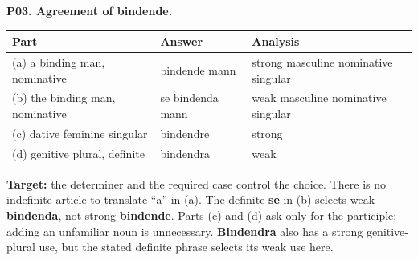\par\begin{minipage}{\linewidth}\raggedright
\textbf{P03. Agreement of bindende.}

\par\begingroup
\fontsize{10.5}{13.2}\selectfont
\setlength{\LTleft}{0pt}\setlength{\LTright}{\fill}
\noindent
\begin{tabular}{@{}>{\raggedright\arraybackslash}p{43.2mm}>{\raggedright\arraybackslash}p{26.98mm}>{\raggedright\arraybackslash}p{48.19mm}@{}}
\toprule
\textbf{Part} & \textbf{Answer} & \textbf{Analysis} \\
\midrule
(a) a binding man, nominative & bindende mann & strong masculine nominative singular \\
(b) the binding man, nominative & se bindenda mann & weak masculine nominative singular \\
(c) dative feminine singular & bindendre & strong \\
(d) genitive plural, definite & bindendra & weak \\
\bottomrule
\end{tabular}
\par\endgroup

\textbf{Target:} the determiner and the required case control the choice. There is no indefinite article to translate “a” in (a). The definite \textbf{se} in (b) selects weak \textbf{bindenda}, not strong \textbf{bindende}. Parts (c) and (d) ask only for the participle; adding an unfamiliar noun is unnecessary. \textbf{Bindendra} also has a strong genitive-plural use, but the stated definite phrase selects its weak use here.

\end{minipage}\par\addvspace{4pt}

